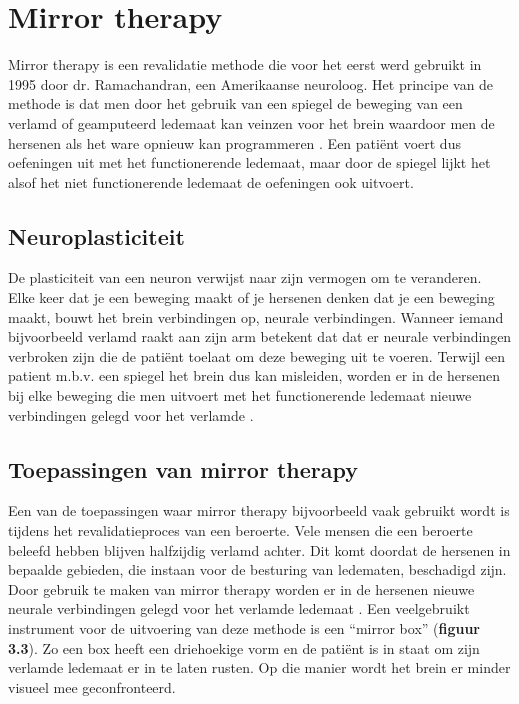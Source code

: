 \section{Mirror therapy}
Mirror therapy is een revalidatie methode die voor het eerst werd gebruikt in 1995 door dr. Ramachandran, een Amerikaanse neuroloog. Het principe van de methode is dat men door het gebruik van een spiegel de beweging van een verlamd of geamputeerd ledemaat kan veinzen voor het brein waardoor men de hersenen als het ware opnieuw kan programmeren \autocite{Physiopedia2019}.
Een patiënt voert dus oefeningen uit met het functionerende ledemaat, maar door de spiegel lijkt het alsof het niet functionerende ledemaat de oefeningen ook uitvoert.

\subsection{Neuroplasticiteit}
De plasticiteit van een neuron verwijst naar zijn vermogen om te veranderen. Elke keer dat je een beweging maakt of je hersenen denken dat je een beweging maakt, bouwt het brein verbindingen op, neurale verbindingen. Wanneer iemand bijvoorbeeld verlamd raakt aan zijn arm betekent dat dat er neurale verbindingen verbroken zijn die de patiënt toelaat om deze beweging uit te voeren. Terwijl een patient m.b.v. een spiegel het brein dus kan misleiden, worden er in de hersenen bij elke beweging die men uitvoert met het functionerende ledemaat nieuwe verbindingen gelegd voor het verlamde  \autocite{Saebo2018}.

\subsection{Toepassingen van mirror therapy}
Een van de toepassingen waar mirror therapy bijvoorbeeld vaak gebruikt wordt is tijdens het revalidatieproces van een beroerte.  Vele mensen die een beroerte beleefd hebben blijven halfzijdig verlamd achter. Dit komt doordat de hersenen in bepaalde gebieden, die instaan voor de besturing van  ledematen, beschadigd zijn. Door gebruik te maken van mirror therapy worden er in de hersenen nieuwe neurale verbindingen gelegd voor het verlamde ledemaat \autocite{Rehab2018}. Een veelgebruikt instrument voor de uitvoering van deze methode is een “mirror box” (\textbf{figuur 3.3}). Zo een box heeft een driehoekige vorm en de patiënt is in staat om zijn verlamde ledemaat er in te laten rusten. Op die manier wordt het brein er minder visueel mee geconfronteerd.

